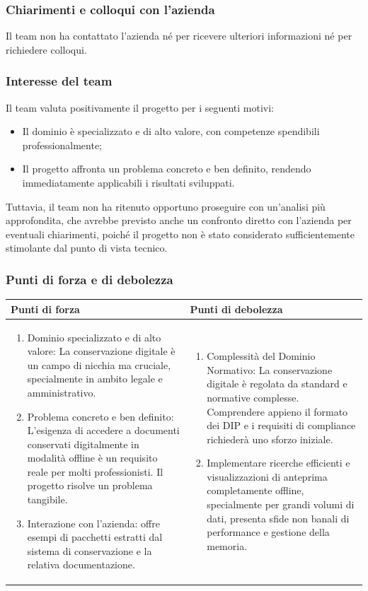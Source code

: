 \documentclass[a4paper,11pt]{article}
\begin{document}
\subsubsection{Chiarimenti e colloqui con l'azienda}
Il team non ha contattato l'azienda né per ricevere ulteriori informazioni né per richiedere colloqui.

\subsubsection{Interesse del team}
Il team valuta positivamente il progetto per i seguenti motivi:
\begin{itemize}[leftmargin=*]
  \item Il dominio è specializzato e di alto valore, con competenze spendibili professionalmente;
  \item Il progetto affronta un problema concreto e ben definito, rendendo immediatamente applicabili i risultati sviluppati.
\end{itemize}
Tuttavia, il team non ha ritenuto opportuno proseguire con un'analisi più approfondita, che avrebbe previsto anche 
un confronto diretto con l'azienda per eventuali chiarimenti, poiché il progetto non è stato considerato sufficientemente
 stimolante dal punto di vista tecnico.

\subsubsection{Punti di forza e di debolezza}
{\footnotesize
\begin{tabularx}{\textwidth}{|X|X|}
\hline
\rowcolor{lightgray!40} %
\textbf{Punti di forza} & \textbf{Punti di debolezza} \\
\hline
\begin{enumerate}
\item Dominio specializzato e di alto valore: La conservazione digitale è un campo di nicchia ma cruciale, specialmente in ambito legale e amministrativo.
\item Problema concreto e ben definito: L'esigenza di accedere a documenti conservati digitalmente in modalità offline è un requisito reale per molti professionisti. Il progetto risolve un problema tangibile.
\item Interazione con l'azienda: offre esempi di pacchetti estratti dal sistema di conservazione e la relativa documentazione.
\end{enumerate}
 & \begin{enumerate}
\item Complessità del Dominio Normativo: La conservazione digitale è regolata da standard e normative complesse. Comprendere appieno il formato dei DIP e i requisiti di compliance richiederà uno sforzo iniziale.
\item Implementare ricerche efficienti e visualizzazioni di anteprima completamente offline, specialmente per grandi volumi di dati, presenta sfide non banali di performance e gestione della memoria.
\end{enumerate} \\
\hline
\end{tabularx}
}
\end{document}
